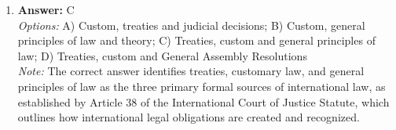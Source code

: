 \documentclass[12pt]{article}
\begin{document}
\begin{enumerate}[label=\arabic*.]
\\ \textit{Options:} A) Piracy jure gentium is subject to flag State jurisdiction; B) Piracy jure gentium is subject to universal jurisdiction; C) Piracy jure gentium is subject to port State jurisdiction; D) Piracy jure gentium is subject to nationality-based jurisdiction
\\ \textit{Note:} Piracy jure gentium is considered a crime that affects the international community as a whole, thus allowing any state to exercise universal jurisdiction over it, irrespective of where the crime occurred or the nationality of the perpetrators or victims.
\item \textbf{Answer:} C
\\ \textit{Options:} A) Custom, treaties and judicial decisions; B) Custom, general principles of law and theory; C) Treaties, custom and general principles of law; D) Treaties, custom and General Assembly Resolutions
\\ \textit{Note:} The correct answer identifies treaties, customary law, and general principles of law as the three primary formal sources of international law, as established by Article 38 of the International Court of Justice Statute, which outlines how international legal obligations are created and recognized.
\end{enumerate}
\end{document}

